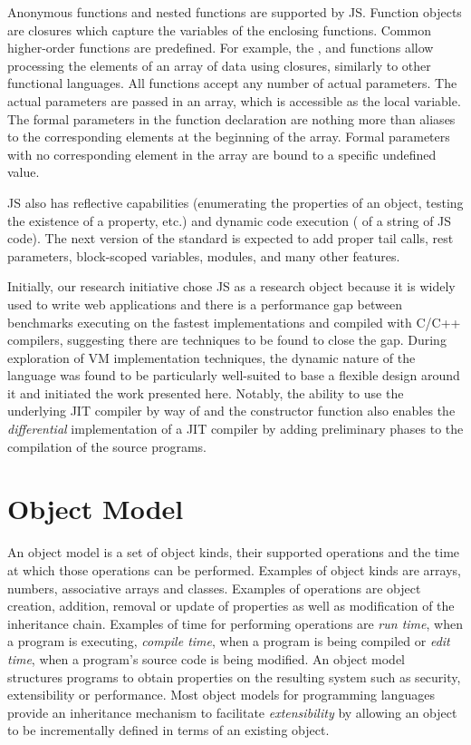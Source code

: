 Anonymous functions and nested functions are supported by JS. Function objects
are closures which capture the variables of the enclosing functions. Common
higher-order functions are predefined. For example, the , 
and  functions allow processing the elements of an array of data
using closures, similarly to other functional languages. All functions accept
any number of actual parameters. The actual parameters are passed in an array,
which is accessible as the  local variable. The formal parameters
in the function declaration are nothing more than aliases to the corresponding
elements at the beginning of the array. Formal parameters with no corresponding
element in the array are bound to a specific undefined value.

JS also has reflective capabilities (enumerating the properties of an object,
testing the existence of a property, etc.) and dynamic code execution
( of a string of JS code).  The next version of the standard is
expected to add proper tail calls, rest parameters, block-scoped variables,
modules, and many other features.

Initially, our research initiative chose JS as a research object because it is
widely used to write web applications and there is a performance gap between
benchmarks executing on the fastest implementations and compiled with C/C++
compilers, suggesting there are techniques to be found to close the gap.
During exploration of VM implementation techniques, the dynamic nature of the
language was found to be particularly well-suited to base a flexible design
around it and initiated the work presented here. Notably, the ability to use
the underlying JIT compiler by way of  and the 
constructor function also enables the \textit{differential} implementation of a
JIT compiler by adding preliminary phases to the compilation of the source
programs.

\section{Object Model}

An object model is a set of object kinds, their supported operations and the
time at which those operations can be performed.  Examples of object kinds are
arrays, numbers, associative arrays and classes.  Examples of operations are
object creation, addition, removal or update of properties as well as
modification of the inheritance chain. Examples of time for performing
operations are \textit{run time}, when a program is executing, \textit{compile
time}, when a program is being compiled or \textit{edit time}, when a program's
source code is being modified. An object model structures programs to obtain
properties on the resulting system such as security, extensibility or
performance. Most object models for programming languages provide an
inheritance mechanism to facilitate \textit{extensibility} by allowing an object
to be incrementally defined in terms of an existing object.

